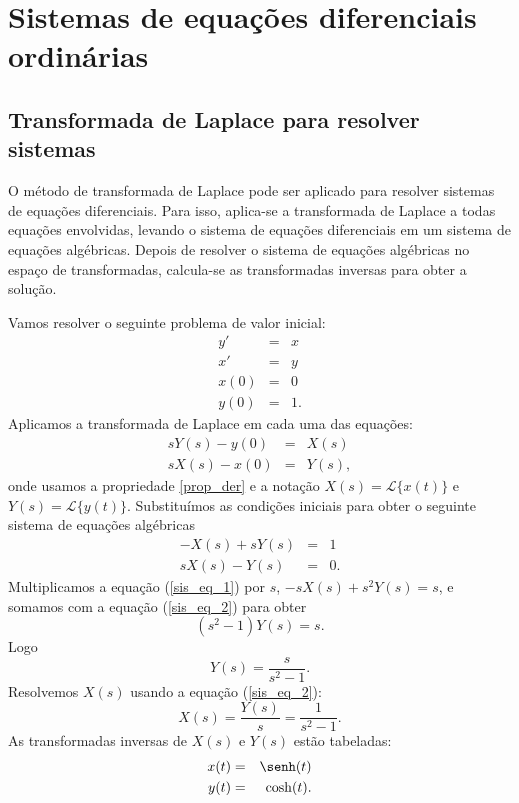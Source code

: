 \chapter{Sistemas de equações diferenciais ordinárias}
\section{Transformada de Laplace para resolver sistemas}
O método de transformada de Laplace pode ser aplicado para resolver sistemas de equações diferenciais. Para isso, aplica-se a transformada de Laplace a todas equações envolvidas, levando o sistema de equações diferenciais em um sistema de equações algébricas. Depois de resolver o sistema de equações algébricas no espaço de transformadas, calcula-se as transformadas inversas para obter a solução.
\begin{ex}Vamos resolver o seguinte problema de valor inicial:
\begin{eqnarray*}
y'&=&x\\
x'&=&y\\
x(0)&=&0\\
y(0)&=&1.
\end{eqnarray*}
Aplicamos a transformada de Laplace em cada uma das equações:
\begin{eqnarray*}
sY(s)-y(0)&=&X(s)\\
sX(s)-x(0)&=&Y(s),
\end{eqnarray*}
onde usamos a propriedade \ref{prop_der} e a notação $X(s)=\mathcal{L}\{x(t)\}$ e $Y(s)=\mathcal{L}\{y(t)\}$. Substituímos as condições iniciais para obter o seguinte sistema de equações algébricas
\begin{eqnarray}
\label{sis_eq_1}-X(s)+sY(s)&=&1\\
\label{sis_eq_2} sX(s)-Y(s)&=&0.
\end{eqnarray}
Multiplicamos a equação (\ref{sis_eq_1}) por $s$, $-sX(s)+s^2Y(s)=s$, e somamos com a equação (\ref{sis_eq_2}) para obter
\begin{equation}
(s^2-1)Y(s)=s.
\end{equation}
Logo
\begin{equation}
Y(s)=\frac{s}{s^2-1}.
\end{equation}
Resolvemos $X(s)$ usando a equação (\ref{sis_eq_2}):
\begin{equation}
X(s)=\frac{Y(s)}{s}=\frac{1}{s^2-1}.
\end{equation}
As transformadas inversas de $X(s)$ e $Y(s)$ estão tabeladas:
\begin{eqnarray*}
x(t)&=&\senh(t)\\
y(t)&=&\cosh(t).
\end{eqnarray*}
\end{ex}
